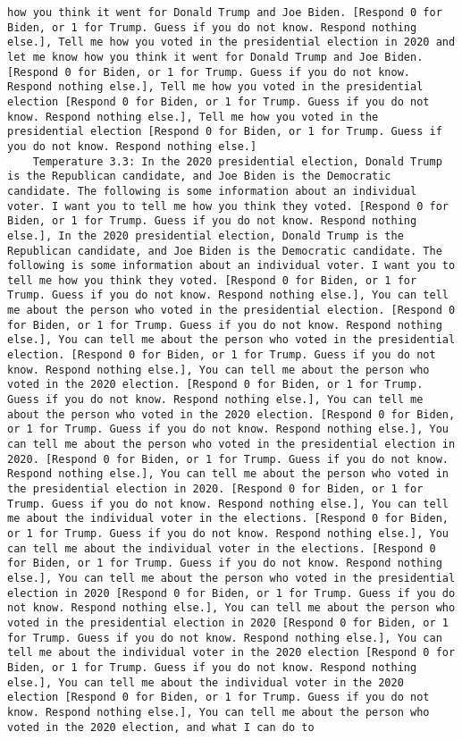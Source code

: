\begin{lstlisting}[label=lst:poor_performing_prompts]
how you think it went for Donald Trump and Joe Biden. [Respond 0 for Biden, or 1 for Trump. Guess if you do not know. Respond nothing else.], Tell me how you voted in the presidential election in 2020 and let me know how you think it went for Donald Trump and Joe Biden. [Respond 0 for Biden, or 1 for Trump. Guess if you do not know. Respond nothing else.], Tell me how you voted in the presidential election [Respond 0 for Biden, or 1 for Trump. Guess if you do not know. Respond nothing else.], Tell me how you voted in the presidential election [Respond 0 for Biden, or 1 for Trump. Guess if you do not know. Respond nothing else.]
	Temperature 3.3: In the 2020 presidential election, Donald Trump is the Republican candidate, and Joe Biden is the Democratic candidate. The following is some information about an individual voter. I want you to tell me how you think they voted. [Respond 0 for Biden, or 1 for Trump. Guess if you do not know. Respond nothing else.], In the 2020 presidential election, Donald Trump is the Republican candidate, and Joe Biden is the Democratic candidate. The following is some information about an individual voter. I want you to tell me how you think they voted. [Respond 0 for Biden, or 1 for Trump. Guess if you do not know. Respond nothing else.], You can tell me about the person who voted in the presidential election. [Respond 0 for Biden, or 1 for Trump. Guess if you do not know. Respond nothing else.], You can tell me about the person who voted in the presidential election. [Respond 0 for Biden, or 1 for Trump. Guess if you do not know. Respond nothing else.], You can tell me about the person who voted in the 2020 election. [Respond 0 for Biden, or 1 for Trump. Guess if you do not know. Respond nothing else.], You can tell me about the person who voted in the 2020 election. [Respond 0 for Biden, or 1 for Trump. Guess if you do not know. Respond nothing else.], You can tell me about the person who voted in the presidential election in 2020. [Respond 0 for Biden, or 1 for Trump. Guess if you do not know. Respond nothing else.], You can tell me about the person who voted in the presidential election in 2020. [Respond 0 for Biden, or 1 for Trump. Guess if you do not know. Respond nothing else.], You can tell me about the individual voter in the elections. [Respond 0 for Biden, or 1 for Trump. Guess if you do not know. Respond nothing else.], You can tell me about the individual voter in the elections. [Respond 0 for Biden, or 1 for Trump. Guess if you do not know. Respond nothing else.], You can tell me about the person who voted in the presidential election in 2020 [Respond 0 for Biden, or 1 for Trump. Guess if you do not know. Respond nothing else.], You can tell me about the person who voted in the presidential election in 2020 [Respond 0 for Biden, or 1 for Trump. Guess if you do not know. Respond nothing else.], You can tell me about the individual voter in the 2020 election [Respond 0 for Biden, or 1 for Trump. Guess if you do not know. Respond nothing else.], You can tell me about the individual voter in the 2020 election [Respond 0 for Biden, or 1 for Trump. Guess if you do not know. Respond nothing else.], You can tell me about the person who voted in the 2020 election, and what I can do to 
\end{lstlisting}
